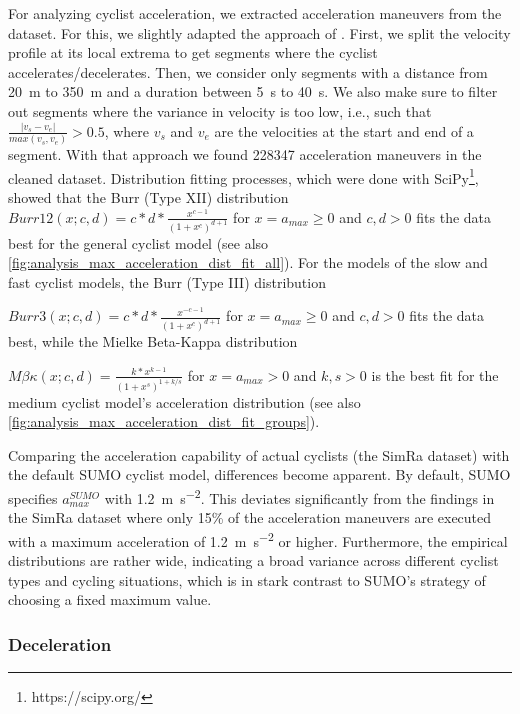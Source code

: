 For analyzing cyclist acceleration, we extracted acceleration maneuvers from the dataset.
For this, we slightly adapted the approach of \cite{ma2016modeling}.
First, we split the velocity profile at its local extrema to get segments where the cyclist accelerates/decelerates.
Then, we consider only segments with a distance from \SI{20}{\metre} to \SI{350}{\metre} and a duration between \SI{5}{\second} to \SI{40}{\second}.
We also make sure to filter out segments where the variance in velocity is too low, i.e., such that $ \frac{|v_{s} - v_{e}|}{max(v_{s},v_{e})} > 0.5 $, where $v_{s}$ and $v_{e}$ are the velocities at the start and end of a segment.
With that approach we found \num{228347} acceleration maneuvers in the cleaned dataset.
Distribution fitting processes, which were done with SciPy\footnote{https://scipy.org/}, showed that the Burr (Type XII) distribution~\cite{burr1942cumulative} $Burr12(x; c,d) = c*d*\frac{x^{c-1}}{(1+x^c)^{d+1}}$ for $x = a_{max} \geq 0$ and $c,d > 0$  fits the data best for the general cyclist model (see also \cref{fig:analysis_max_acceleration_dist_fit_all}).
For the models of the slow and fast cyclist models, the Burr (Type III) distribution~\cite{burr1942cumulative} 

$Burr3(x; c,d) = c*d*\frac{x^{-c-1}}{(1+x^c)^{d+1}}$ for $x = a_{max} \geq 0$ and $c,d > 0$ fits the data best, while the Mielke Beta-Kappa distribution~\cite{mielke1973distribution} 

$M\beta\kappa(x; c,d) = \frac{k*x^{k-1}}{(1+x^s)^{1+k/s}}$ for $x = a_{max} > 0$ and $k,s > 0$ is the best fit for the medium cyclist model's acceleration distribution (see also \cref{fig:analysis_max_acceleration_dist_fit_groups}).

Comparing the acceleration capability of actual cyclists (the SimRa dataset) with the default SUMO cyclist model, differences become apparent.
By default, SUMO specifies $a_{max}^{SUMO}$ with \SI{1.2}{\metre\per\square\second}.
This deviates significantly from the findings in the SimRa dataset where only \num{15}\% of the acceleration maneuvers are executed with a maximum acceleration of \SI{1.2}{\metre\per\square\second} or higher.
Furthermore, the empirical distributions are rather wide, indicating a broad variance across different cyclist types and cycling situations, which is in stark contrast to SUMO's strategy of choosing a fixed maximum value.

\subsubsection{Deceleration}
\label{subsubsec:deceleration_preprocessing}

